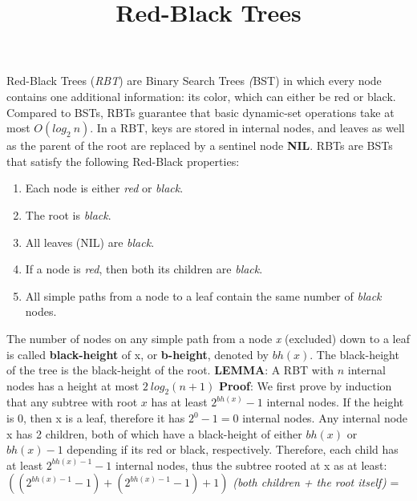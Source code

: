 \documentclass[14pt]{article}
\title{\vspace{-1.0cm} Red-Black Trees}
\date{}
\begin{document}
    \maketitle
    \vspace{-2.0cm}
Red-Black Trees (\textit{RBT}) are Binary Search Trees \textit({BST}) in which every node contains one additional information: its color,
which can either be red or black.
Compared to BSTs, RBTs guarantee that basic dynamic-set operations take at most $O(log_2 \ n)$.
In a RBT, keys are stored in internal nodes, and leaves as well as the parent of the root are replaced
by a sentinel node \textbf{NIL}.
RBTs are BSTs that satisfy the following Red-Black properties:
\begin{enumerate}
    \item Each node is either \textit{red} or \textit{black}.
    \item The root is \textit{black}.
    \item All leaves (NIL) are \textit{black}.
    \item If a node is \textit{red}, then both its children are \textit{black}.
    \item All simple paths from a node to a leaf contain the same number of \textit{black} nodes.
\end{enumerate}
The number of nodes on any simple path from a node \textit{x} (excluded) down to a leaf is called
\textbf{black-height} of x, or \textbf{b-height}, denoted by $bh(x)$. \newline
The black-height of the tree is the black-height of the root. \newline \newline
\textbf{LEMMA}: A RBT with $n$ internal nodes has a height at most $2 \ log_2(n + 1)$ \newline \newline
    \textbf{Proof}: \newline
We first prove by induction that any subtree with root $x$ has at least $2^{bh(x)} - 1$ internal nodes.
If the height is 0, then x is a leaf, therefore it has $2^0 - 1 = 0$ internal nodes. \newline
Any internal node x has 2 children, both of which have a black-height of either $bh(x)$ or $bh(x) - 1$
depending if its red or black, respectively. \newline
Therefore, each child has at least $2^{bh(x) - 1} - 1$ internal nodes, thus the subtree rooted at x
as at least: \newline
    $((2^{bh(x) - 1} - 1) + (2^{bh(x) - 1} - 1) + 1)$ \textit{(both children + the root itself)} = \newline \newline
\end{document}
